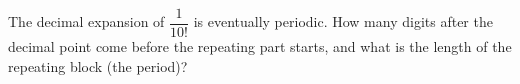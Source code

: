 The decimal expansion of $\dfrac{1}{10!}$ is eventually periodic. How many digits after the decimal point come before the repeating part starts, and what is the length of the repeating block (the period)?
